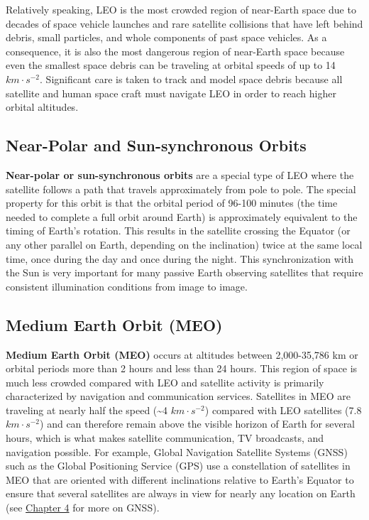 \documentclass[
]{book}
\begin{document}
Relatively speaking, LEO is the most crowded region of near-Earth space due to decades of space vehicle launches and rare satellite collisions that have left behind debris, small particles, and whole components of past space vehicles. As a consequence, it is also the most dangerous region of near-Earth space because even the smallest space debris can be traveling at orbital speeds of up to 14 \(km·s^{-2}\). Significant care is taken to track and model space debris because all satellite and human space craft must navigate LEO in order to reach higher orbital altitudes.

\subsection{Near-Polar and Sun-synchronous Orbits}\label{near-polar-and-sun-synchronous-orbits}

\textbf{Near-polar or sun-synchronous orbits} are a special type of LEO where the satellite follows a path that travels approximately from pole to pole. The special property for this orbit is that the orbital period of 96-100 minutes (the time needed to complete a full orbit around Earth) is approximately equivalent to the timing of Earth's rotation. This results in the satellite crossing the Equator (or any other parallel on Earth, depending on the inclination) twice at the same local time, once during the day and once during the night. This synchronization with the Sun is very important for many passive Earth observing satellites that require consistent illumination conditions from image to image.

\subsection{Medium Earth Orbit (MEO)}\label{medium-earth-orbit-meo}

\textbf{Medium Earth Orbit (MEO)} occurs at altitudes between 2,000-35,786 km or orbital periods more than 2 hours and less than 24 hours. This region of space is much less crowded compared with LEO and satellite activity is primarily characterized by navigation and communication services. Satellites in MEO are traveling at nearly half the speed (\textasciitilde4 \(km·s^{-2}\)) compared with LEO satellites (7.8 \(km·s^{-2}\)) and can therefore remain above the visible horizon of Earth for several hours, which is what makes satellite communication, TV broadcasts, and navigation possible. For example, Global Navigation Satellite Systems (GNSS) such as the Global Positioning Service (GPS) use a constellation of satellites in MEO that are oriented with different inclinations relative to Earth's Equator to ensure that several satellites are always in view for nearly any location on Earth (see \href{https://ubc-geomatics-textbook.github.io/geomatics-textbook/collecting-and-editing-data.html}{Chapter 4} for more on GNSS).
\end{document}
